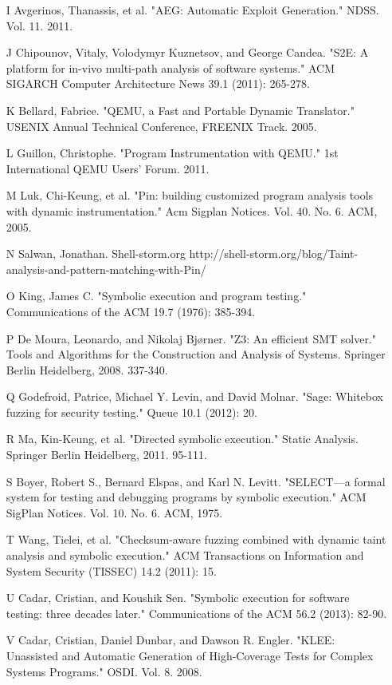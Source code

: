 \documentclass[11pt,expanded,copyright]{fsuthesis}
\begin{document}
\begin{itemize}
	\item [I] Avgerinos, Thanassis, et al. "AEG: Automatic Exploit Generation." NDSS. Vol. 11. 2011.
	\item [J] Chipounov, Vitaly, Volodymyr Kuznetsov, and George Candea. "S2E: A platform for in-vivo multi-path analysis of software systems." ACM SIGARCH Computer Architecture News 39.1 (2011): 265-278.
	\item [K] Bellard, Fabrice. "QEMU, a Fast and Portable Dynamic Translator." USENIX Annual Technical Conference, FREENIX Track. 2005.
	\item [L] Guillon, Christophe. "Program Instrumentation with QEMU." 1st International QEMU Users’ Forum. 2011.
	\item [M] Luk, Chi-Keung, et al. "Pin: building customized program analysis tools with dynamic instrumentation." Acm Sigplan Notices. Vol. 40. No. 6. ACM, 2005.
	\item [N] Salwan, Jonathan. Shell-storm.org http://shell-storm.org/blog/Taint-analysis-and-pattern-matching-with-Pin/
	\item [O] King, James C. "Symbolic execution and program testing." Communications of the ACM 19.7 (1976): 385-394.
	\item [P] De Moura, Leonardo, and Nikolaj Bjørner. "Z3: An efficient SMT solver." Tools and Algorithms for the Construction and Analysis of Systems. Springer Berlin Heidelberg, 2008. 337-340.
	\item [Q] Godefroid, Patrice, Michael Y. Levin, and David Molnar. "Sage: Whitebox fuzzing for security testing." Queue 10.1 (2012): 20.
	\item [R] Ma, Kin-Keung, et al. "Directed symbolic execution." Static Analysis. Springer Berlin Heidelberg, 2011. 95-111.
	\item [S] Boyer, Robert S., Bernard Elspas, and Karl N. Levitt. "SELECT—a formal system for testing and debugging programs by symbolic execution." ACM SigPlan Notices. Vol. 10. No. 6. ACM, 1975.
	\item [T] Wang, Tielei, et al. "Checksum-aware fuzzing combined with dynamic taint analysis and symbolic execution." ACM Transactions on Information and System Security (TISSEC) 14.2 (2011): 15.
	\item [U] Cadar, Cristian, and Koushik Sen. "Symbolic execution for software testing: three decades later." Communications of the ACM 56.2 (2013): 82-90.
	\item [V] Cadar, Cristian, Daniel Dunbar, and Dawson R. Engler. "KLEE: Unassisted and Automatic Generation of High-Coverage Tests for Complex Systems Programs." OSDI. Vol. 8. 2008.

\end{itemize}
\end{document}
